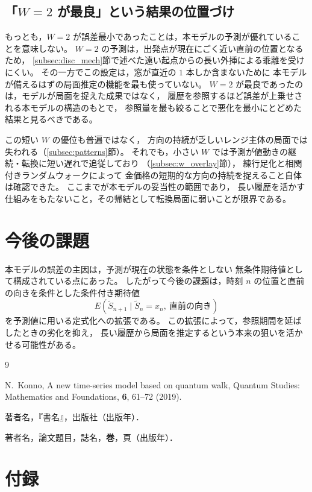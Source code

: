 \documentclass[a4j,dvipdfmx]{jsarticle}
\theoremstyle{plainnote}
\begin{document}
\subsection{「$W=2$ が最良」という結果の位置づけ}

もっとも，$W=2$ が誤差最小であったことは，本モデルの予測が優れていることを意味しない。
$W=2$ の予測は，出発点が現在にごく近い直前の位置となるため，
\ref{subsec:disc_mech}節で述べた遠い起点からの長い外挿による乖離を受けにくい。
その一方でこの設定は，窓が直近の $1$ 本しか含まないために
本モデルが備えるはずの局面推定の機能を最も使っていない。
$W=2$ が最良であったのは，モデルが局面を捉えた成果ではなく，
履歴を参照するほど誤差が上乗せされる本モデルの構造のもとで，
参照量を最も絞ることで悪化を最小にとどめた結果と見るべきである。

この短い $W$ の優位も普遍ではなく，
方向の持続が乏しいレンジ主体の局面では失われる（\ref{subsec:patterns}節）。
それでも，小さい $W$ では予測が値動きの継続・転換に短い遅れで追従しており
（\ref{subsec:w_overlay}節），
練行足化と相関付きランダムウォークによって
金価格の短期的な方向の持続を捉えること自体は確認できた。
ここまでが本モデルの妥当性の範囲であり，
長い履歴を活かす仕組みをもたないこと，その帰結として転換局面に弱いことが限界である。
\newpage
\section{今後の課題}

本モデルの誤差の主因は，予測が現在の状態を条件としない
無条件期待値として構成されている点にあった。
したがって今後の課題は，時刻 $n$ の位置と直前の向きを条件とした条件付き期待値
\[
  E(\tilde{S}_{n+1}\mid \tilde{S}_n=x_n,\ \text{直前の向き})
\]
を予測値に用いる定式化への拡張である。
この拡張によって，参照期間を延ばしたときの劣化を抑え，
長い履歴から局面を推定するという本来の狙いを活かせる可能性がある。


\newpage
\begin{thebibliography}{9}

  N.~Konno,
  A new time-series model based on quantum walk,
  Quantum Studies: Mathematics and Foundations, \textbf{6}, 61--72 (2019).

  著者名，『書名』，出版社（出版年）．

  著者名，論文題目，誌名，\textbf{巻}，頁（出版年）．

\end{thebibliography}
\newpage
\section{付録}
\end{document}
